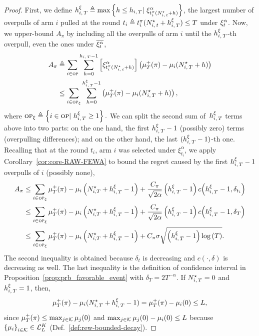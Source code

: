 \begin{proof}

First, we define $h_{i,\,T}^\xi \triangleq \max\left\{ h \leq h_{i,\,T} | \ \xi^\alpha_{t_i^{\pi}(N_{i,\,t}^\star + h)}\right\}$, the largest number of overpulls of arm $i$ pulled at the round $t_i \triangleq t_i^{\pi}(N_{i,\,t}^\star + h_{i,\,T}^\xi) \leq T$ under $\xi^\alpha_t$. Now, we upper-bound $A_{\pi}$ by including all the overpulls of arm $i$ until the $h_{i,\,T}^\xi$-th overpull, even the ones under $\overline{\xi^\alpha_t}$,
\begin{align*}
A_{\pi} &\triangleq  \sum_{i\in \textsc{op}}   \sum_{h=0}^{h_{i,\,T}-1}  \left[ \xi^\alpha_{t_i^{\pi}(N_{i,\,t}^\star + h) }\right] \left(\mu^+_T(\pi) - \mu_i(N_{i,\,T}^{\star} + h)\right) \\
&
\leq \sum_{i\in \textsc{op}_\xi}   \sum_{h=0}^{h_{i,\,T}^\xi-1}  \left(\mu^+_T(\pi) - \mu_i(N_{i,\,T}^{\star} + h)\right),
\end{align*}
where $\textsc{op}_\xi \triangleq \left\{ i \in \textsc{op} | \  h_{i,\,T}^\xi \geq 1 \right\}.$ We can split the second sum of~$h_{i,\,T}^\xi$ terms above into two parts: on the one hand, the first $h_{i,\,T}^\xi-1$ (possibly zero) terms (overpulling differences); and on the other hand, the last  $(h_{i,\,T}^\xi-1)$-th one. Recalling that at the round $t_i$, arm $i$ was selected under $\xi^\alpha_{t_i}$, we apply
Corollary~\ref{cor:core-RAW-FEWA} to bound the regret caused by the first $h_{i,\,T}^\xi-1$ overpulls of $i$ (possibly none),
\begin{align}
A_{\pi} &\leq  \sum_{i \in \textsc{op}_\xi}   \mu^+_T(\pi) - \mu_i\left(N_{i, T}^\star + h_{i,\,T}^\xi  -1\right) + \frac{C_\pi}{\sqrt{2\alpha}}\left(h_{i,\,T}^\xi - 1\right)c\!\left(h_{i,\,T}^\xi-1, \delta_{t_i }\right) \label{eq:cor1-use1}\\
&\leq \sum_{i \in \textsc{op}_\xi}   \mu^+_T(\pi) - \mu_i\left(N_{i, T}^\star + h_{i,\,T}^\xi  -1\right) + \frac{C_\pi}{\sqrt{2\alpha}}\left(h_{i,\,T}^\xi - 1\right)c\!\left(h_{i,\,T}^\xi-1, \delta_{T}\right)\\
&\leq \sum_{i \in \textsc{op}_\xi}   \mu^+_T(\pi) - \mu_i\left(N_{i, T}^\star + h_{i,\,T}^\xi  -1\right) + C_\pi \sigma\sqrt{\left(h_{i,\,T}^\xi - 1\right)\log{\left(T\right)}}.
\label{eq:lasttimepdq}
\end{align}
 The second inequality is obtained because $\delta_t$ is decreasing and $c(\cdot,\delta)$ is decreasing as well. The last inequality is the definition of confidence interval in Proposition~\ref{prop:prb_favorable_event} with $\delta_T = 2T^{-\alpha}$. 
 If  $N_{i,\,T}^{\star} = 0$ and $h_{i,\,T}^\xi = 1$, then,
\[ \mu^+_T(\pi) - \mu_i(N_{i,\,T}^{\star} + h_{i,\,T}^\xi - 1) =  \mu^+_T(\pi) - \mu_i(0) \leq L,\] 
since $\mu^+_T (\pi) \leq \max_{j\in\mathcal{K}}\mu_j(0)$ and  $\max_{j\in\mathcal{K}}\mu_j(0) - \mu_i(0) \leq L$ because $\left\{\mu_i\right\}_{i \in \mathcal{K}} \in \mathcal{L}_L^K$ (Def.~\ref{def:rew-bounded-decay}).

\end{proof}
